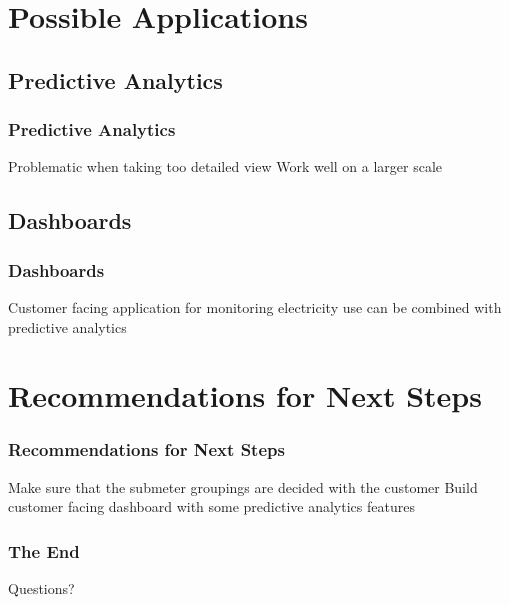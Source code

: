\documentclass[10pt]{beamer}
\begin{document}
\section{Possible Applications}

\subsection{Predictive Analytics}

\begin{frame}
\frametitle{Predictive Analytics}

Problematic when taking too detailed view
Work well on a larger scale

\end{frame}

\subsection{Dashboards}

\begin{frame}
\frametitle{Dashboards}

Customer facing application for monitoring electricity use
can be combined with predictive analytics

\end{frame}


\section{Recommendations for Next Steps}


\begin{frame}
\frametitle{Recommendations for Next Steps}

Make sure that the submeter groupings are decided with the customer
Build customer facing dashboard with some predictive analytics features

\end{frame}

\begin{frame}
\frametitle{The End}

\LARGE{\centerline{Questions?}}

\end{frame}

\end{document}

